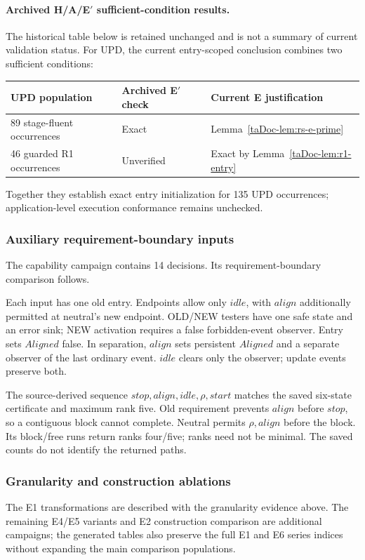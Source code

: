 \documentclass[11pt]{article}
\begin{document}
\paragraph{Archived H/A/E$'$ sufficient-condition results.}
The historical table below is retained unchanged and is not a summary of current validation status. For UPD, the current entry-scoped conclusion combines two sufficient conditions:
\begin{center}\small
\begin{tabular}{@{}p{.33\linewidth}p{.25\linewidth}p{.34\linewidth}@{}}\toprule
UPD population & Archived E$'$ check & Current E justification\\\midrule
89 stage-fluent occurrences & Exact & Lemma~\ref{taDoc-lem:rs-e-prime}\\
46 guarded R1 occurrences & Unverified & Exact by Lemma~\ref{taDoc-lem:r1-entry}\\\bottomrule
\end{tabular}
\end{center}
Together they establish exact entry initialization for 135 UPD occurrences; application-level execution conformance remains unchecked.



\subsubsection{Auxiliary requirement-boundary inputs}
\label{supp:boundary-inputs}
The capability campaign contains 14 decisions. Its requirement-boundary comparison follows.

Each input has one old entry. Endpoints allow only $idle$, with $align$ additionally permitted at neutral's new endpoint. OLD/NEW testers have one safe state and an error sink; NEW activation requires a false forbidden-event observer. Entry sets $Aligned$ false. In separation, $align$ sets persistent $Aligned$ and a separate observer of the last ordinary event. $idle$ clears only the observer; update events preserve both.

The source-derived sequence $stop,align,idle,\rho,start$ matches the saved six-state certificate and maximum rank five. Old requirement prevents $align$ before $stop$, so a contiguous block cannot complete. Neutral permits $\rho,align$ before the block. Its block/free runs return ranks four/five; ranks need not be minimal. The saved counts do not identify the returned paths.

\subsubsection{Granularity and construction ablations}
\label{supp:vthree-ablations}
The E1 transformations are described with the granularity evidence above. The remaining E4/E5 variants and E2 construction comparison are additional campaigns; the generated tables also preserve the full E1 and E6 series indices without expanding the main comparison populations.
\end{document}
